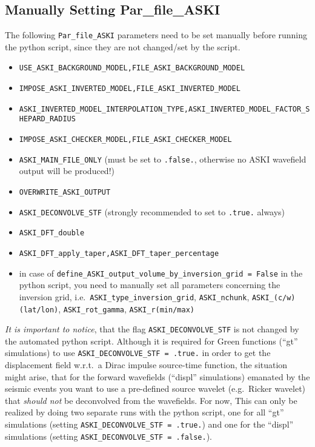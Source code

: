 \documentclass[12pt,a4paper]{article}
\newcommand{\lcode}[1]{\nolinkurl{#1}}
\newcommand{\lcodetitle}[1]{ {\ttfamily #1} }
\newcommand{\ASKI}{ {\ttfamily ASKI} }
\begin{document}
\subsection{Manually Setting \lcodetitle{Par\_file\_ASKI}}
The following \lcode{Par_file_ASKI} parameters need to be set manually before running the python script, 
since they are not changed/set by the script.
\begin{itemize}
\item \lcode{USE_ASKI_BACKGROUND_MODEL,FILE_ASKI_BACKGROUND_MODEL}
\item \lcode{IMPOSE_ASKI_INVERTED_MODEL,FILE_ASKI_INVERTED_MODEL}
\item \lcode{ASKI_INVERTED_MODEL_INTERPOLATION_TYPE,ASKI_INVERTED_MODEL_FACTOR_SHEPARD_RADIUS}
\item \lcode{IMPOSE_ASKI_CHECKER_MODEL,FILE_ASKI_CHECKER_MODEL}
\item \lcode{ASKI_MAIN_FILE_ONLY} (must be set to \lcode{.false.}, otherwise no \ASKI{} wavefield output will be produced!)
\item \lcode{OVERWRITE_ASKI_OUTPUT}
\item \lcode{ASKI_DECONVOLVE_STF} (strongly recommended to set to \lcode{.true.} always)
\item \lcode{ASKI_DFT_double}
\item \lcode{ASKI_DFT_apply_taper,ASKI_DFT_taper_percentage}
\item in case of \lcode{define_ASKI_output_volume_by_inversion_grid = False} in the python script, 
  you need to manually set all parameters concerning the inversion grid, i.e.\ \lcode{ASKI_type_inversion_grid}, 
  \lcode{ASKI_nchunk}, \lcode{ASKI_(c/w)(lat/lon)}, \lcode{ASKI_rot_gamma}, \lcode{ASKI_r(min/max)}
\end{itemize}
\emph{It is important to notice}, that the flag \lcode{ASKI_DECONVOLVE_STF} is not changed by 
the automated python script. Although it is required for Green functions (``gt'' simulations) to use 
\lcode{ASKI_DECONVOLVE_STF = .true.} in order to get the displacement field w.r.t.\ a Dirac impulse
source-time function, the situation might arise, that for the forward wavefields (``displ'' simulations) 
emanated by the seismic events you want to use a pre-defined source wavelet (e.g.\ Ricker wavelet) 
that \emph{should not} be deconvolved from the wavefields. 
For now, This can only be realized by doing two separate runs
with the python script, one for all ``gt'' simulations (setting \lcode{ASKI_DECONVOLVE_STF = .true.}) 
and one for the ``displ'' simulations (setting \lcode{ASKI_DECONVOLVE_STF = .false.}).
\end{document}
